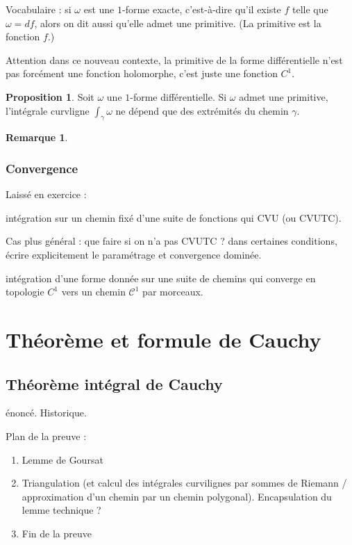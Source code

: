 \documentclass[11pt,a4paper]{book}
\theoremstyle{definition}
\newtheorem{proposition}[theoreme]{Proposition}
\theoremstyle{plain}
\newtheorem{remarque}[theoreme]{Remarque}
\begin{document}
Vocabulaire : si $\omega$ est une $1$-forme exacte,  c'est-à-dire qu'il existe $f$ telle que $\omega=df$, alors on dit aussi qu'elle admet une primitive. (La primitive est la fonction $f$.)

Attention dans ce nouveau contexte, la primitive de la forme différentielle n'est pas forcément  une fonction holomorphe, c'est juste une fonction $C^1$.

\begin{proposition}
Soit $\omega$ une $1$-forme différentielle.
Si $\omega$ admet une primitive, l'intégrale curvligne  $\int_\gamma \omega$ ne dépend que des extrémités du chemin $\gamma$.
\end{proposition}

\begin{remarque}
\end{remarque}

\subsection{Convergence}

Laissé en exercice : 

intégration sur un chemin fixé d'une suite de fonctions qui CVU (ou CVUTC).

Cas plus général : que faire si on n'a pas CVUTC ? dans certaines conditions, écrire explicitement le paramétrage et convergence dominée.

intégration d'une forme donnée sur une suite de chemins qui converge en topologie $C^1$ vers un chemin $\mathcal C^1$ par morceaux.




\chapter{Théorème et formule de Cauchy}

\section{Théorème intégral de Cauchy}

énoncé. Historique.

Plan de la preuve : 
\begin{enumerate}
\item Lemme de Goursat
\item Triangulation (et calcul des intégrales curvilignes par sommes de Riemann / approximation d'un chemin par un chemin polygonal). Encapsulation du lemme technique ?
\item Fin de la preuve
\end{enumerate}
\end{document}
